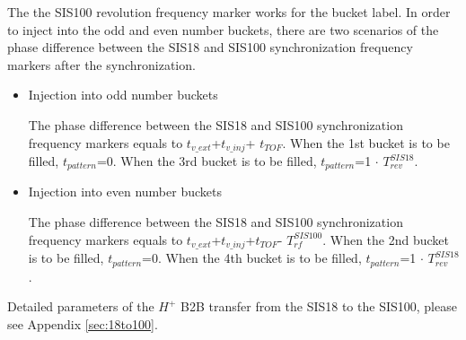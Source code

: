 The the SIS100 revolution frequency marker works for the bucket label. In order to inject into the odd and even number buckets, there are two scenarios of the phase difference between the SIS18 and SIS100 synchronization frequency markers after the synchronization.
\begin{itemize}
	\item Injection into odd number buckets
		
		The phase difference between the SIS18 and SIS100 synchronization frequency markers equals to $t_{v\_ext}$+$t_{v\_inj}$+ $t_{TOF}$. When the 1st bucket is to be filled, $t_{pattern}$=0. When the 3rd bucket is to be filled, $t_{pattern}$=1 $\cdot$ $T_{\mathit{rev}}^{\mathit{SIS18}}$. 
	\item Injection into even number buckets
	
		The phase difference between the SIS18 and SIS100 synchronization frequency markers equals to $t_{v\_ext}$+$t_{v\_inj}$+$t_{TOF}$- $T_{\mathit{rf}}^{\mathit{SIS100}}$. When the 2nd bucket is to be filled, $t_{pattern}$=0. When the 4th bucket is to be filled, $t_{pattern}$=1 $\cdot$ $T_{\mathit{rev}}^{\mathit{SIS18}}$. 

\end{itemize}

Detailed parameters of the $H^{+}$ B2B transfer from the SIS18 to the SIS100, please see Appendix \ref{sec:18to100}.

